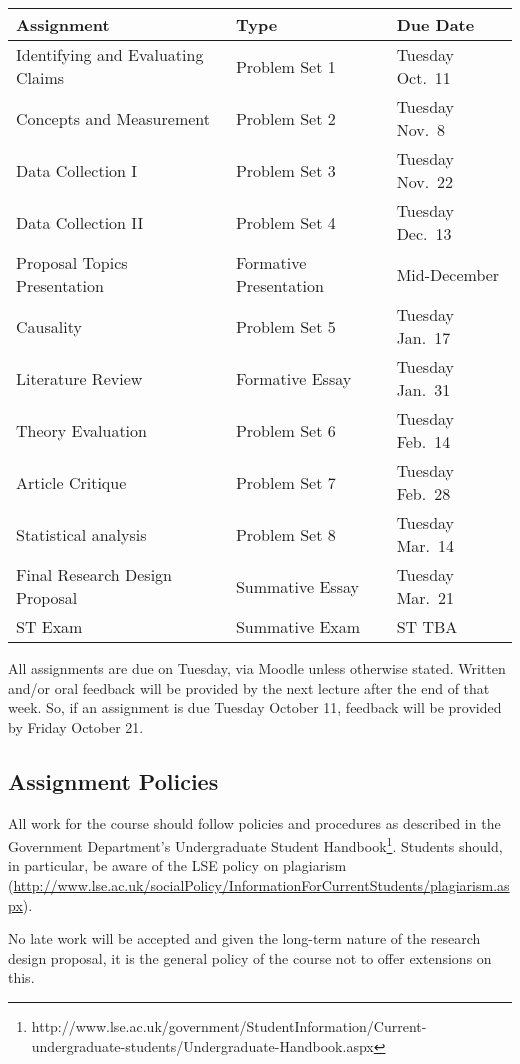 \documentclass[12pt,a4paper]{article}
\begin{document}
\begin{center}
\begin{tabular}{lll} \toprule
\textbf{Assignment} & \textbf{Type} & \textbf{Due Date} \\ \midrule
Identifying and Evaluating Claims & Problem Set 1 & Tuesday Oct.~11 \\
Concepts and Measurement & Problem Set 2 & Tuesday Nov.~8 \\
Data Collection I & Problem Set 3 & Tuesday Nov.~22 \\
Data Collection II & Problem Set 4 & Tuesday Dec.~13 \\
Proposal Topics Presentation & Formative Presentation & Mid-December \\  \midrule 
Causality & Problem Set 5 & Tuesday Jan.~17 \\
Literature Review & Formative Essay & Tuesday Jan.~31 \\ 
Theory Evaluation & Problem Set 6 & Tuesday Feb.~14 \\
Article Critique & Problem Set 7 & Tuesday Feb.~28 \\
Statistical analysis & Problem Set 8 & Tuesday Mar.~14 \\ \midrule 
Final Research Design Proposal & Summative Essay & Tuesday Mar.~21 \\ \midrule 
ST Exam & Summative Exam & ST TBA \\
\bottomrule
\end{tabular}
\end{center}

All assignments are due on Tuesday, via Moodle unless otherwise stated. Written and/or oral feedback will be provided by the next lecture after the end of that week. So, if an assignment is due Tuesday October 11, feedback will be provided by Friday October 21.

\subsection{Assignment Policies}

All work for the course should follow policies and procedures as described in the Government Department's Undergraduate Student Handbook\footnote{http://www.lse.ac.uk/government/StudentInformation/Current-undergraduate-students/Undergraduate-Handbook.aspx}. Students should, in particular, be aware of the LSE policy on plagiarism (\url{http://www.lse.ac.uk/socialPolicy/InformationForCurrentStudents/plagiarism.aspx}).

No late work will be accepted and given the long-term nature of the research design proposal, it is the general policy of the course not to offer extensions on this.
\end{document}
